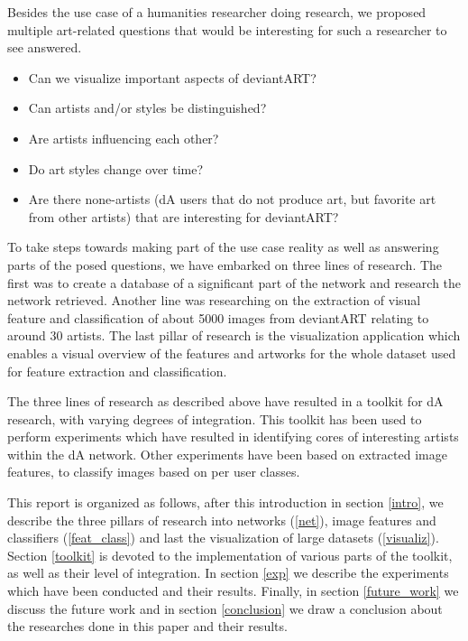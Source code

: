 Besides the use case of a humanities researcher doing research, we proposed multiple art-related questions that would be interesting for such a researcher to see answered.
\begin{itemize}
\item Can we visualize important aspects of deviantART?
\item Can artists and/or styles be distinguished?
\item Are artists influencing each other?
\item Do art styles change over time?
\item Are there none-artists (dA users that do not produce art, but favorite art from other artists) that are interesting for deviantART?
\end{itemize}

To take steps towards making part of the use case reality as well as answering parts of the posed questions, we have embarked on three lines of research. The first was to create a database of a significant part of the network and research the network retrieved. Another line was researching on the extraction of visual feature and classification of about 5000 images from deviantART relating to around 30 artists. The last pillar of research is the visualization application which enables a visual overview of the features and artworks for the whole dataset used for feature extraction and classification.

The three lines of research as described above have resulted in a toolkit for dA research, with varying degrees of integration. This toolkit has been used to perform experiments which have resulted in identifying cores of interesting artists within the dA network. Other experiments have been based on extracted image features, to classify images based on per user classes.

This report is organized as follows, after this introduction in section \ref{intro}, we describe the three pillars of research into networks (\ref{net}), image features and classifiers (\ref{feat_class}) and last the visualization of large datasets (\ref{visualiz}). Section \ref{toolkit} is devoted to the implementation of various parts of the toolkit, as well as their level of integration. In section \ref{exp} we describe the experiments which have been conducted and their results. Finally, in section \ref{future_work} we discuss the future work and in section \ref{conclusion} we draw a conclusion about the researches done in this paper and their results. 